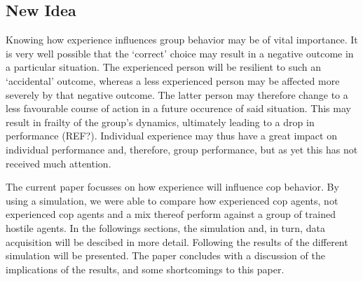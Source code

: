 \subsection{New Idea}
Knowing how experience influences group behavior may be of vital importance. It is very well possible that the `correct' choice may result in a negative outcome in a particular situation. The experienced person will be resilient to such an `accidental' outcome, whereas a less experienced person may be affected more severely by that negative outcome. The latter person may therefore change to a less favourable course of action in a future occurence of said situation. This may result in frailty of the group's dynamics, ultimately leading to a drop in performance (REF?). Individual experience may thus have a great impact on individual performance and, therefore, group performance, but as yet this has not received much attention. 

The current paper focusses on how experience will influence cop behavior. By using a simulation, we were able to compare how experienced cop agents, not experienced cop agents and a mix thereof perform against a group of trained hostile agents. In the followings sections, the simulation and, in turn, data acquisition will be descibed in more detail. Following the results of the different simulation will be presented. The paper concludes with a discussion of the implications of the results, and some shortcomings to this paper. 